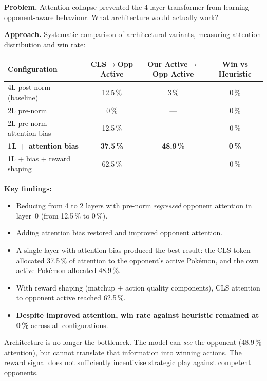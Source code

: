\textbf{Problem.} Attention collapse prevented the 4-layer transformer from
learning opponent-aware behaviour.  What architecture would actually work?

\textbf{Approach.} Systematic comparison of architectural variants, measuring
attention distribution and win rate:

\begin{center}
\small
\begin{tabularx}{\textwidth}{l c c c}
  \toprule
  \textbf{Configuration} &
  \textbf{CLS$\to$Opp Active} &
  \textbf{Our Active$\to$Opp Active} &
  \textbf{Win vs Heuristic} \\
  \midrule
  4L post-norm (baseline)    & 12.5\,\% & 3\,\%   & 0\,\% \\
  2L pre-norm               & 0\,\%    & ---      & 0\,\% \\
  2L pre-norm + attention bias & 12.5\,\% & ---   & 0\,\% \\
  \textbf{1L + attention bias} & \textbf{37.5\,\%} & \textbf{48.9\,\%} & \textbf{0\,\%} \\
  1L + bias + reward shaping & 62.5\,\% & ---      & 0\,\% \\
  \bottomrule
\end{tabularx}
\end{center}

\textbf{Key findings:}
\begin{itemize}
  \item Reducing from 4 to 2 layers with pre-norm \emph{regressed} opponent
        attention in layer~0 (from 12.5\,\% to 0\,\%).
  \item Adding attention bias restored and improved opponent attention.
  \item A single layer with attention bias produced the best result: the CLS
        token allocated 37.5\,\% of attention to the opponent's active
        Pok\'{e}mon, and the own active Pok\'{e}mon allocated 48.9\,\%.
  \item With reward shaping (matchup + action quality components), CLS
        attention to opponent active reached 62.5\,\%.
  \item \textbf{Despite improved attention, win rate against heuristic remained
        at 0\,\%} across all configurations.
\end{itemize}

\begin{keyinsight}
Architecture is no longer the bottleneck.  The model can \emph{see} the
opponent (48.9\,\% attention), but cannot translate that information into
winning actions.  The reward signal does not sufficiently incentivise
strategic play against competent opponents.
\end{keyinsight}

